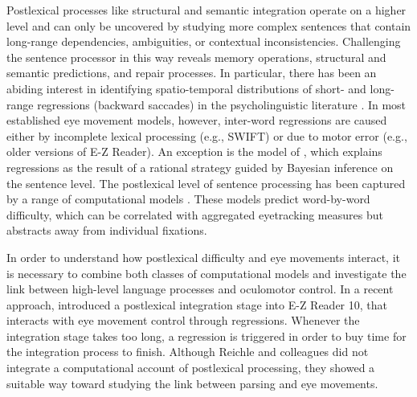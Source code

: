 \documentclass{cambridge7A}\usepackage[]{graphicx}\usepackage[]{color}
\begin{document}
Postlexical processes  like structural and semantic integration operate on a higher level and can only be uncovered by studying more complex sentences that contain long-range dependencies, ambiguities, or contextual inconsistencies.  Challenging the sentence processor in this way reveals memory operations, structural and semantic predictions, and repair processes.
In particular, there has been an abiding interest in identifying spatio-temporal distributions of short- and long-range regressions (backward saccades) in the  psycholinguistic literature \citep{vanDyke2003,FrazierRayner1982,MalsburgVasishth2011,MalsburgVasishth2012,Meseguer2002,MitchellEtAl2008,Weger2007}. 
In most established eye movement models, however, inter-word regressions are caused either by incomplete lexical processing (e.g., SWIFT) or due to motor error (e.g., older versions of E-Z Reader).  An exception is the model of \cite{BicknellLevy2010a}, which explains regressions as the result of a rational strategy guided by Bayesian inference on the sentence level. 
The postlexical level of sentence processing has been captured by a range of computational models \citep{Binder2001,Elman:2005p2,Hale2011,JustCarpenter1992,Konieczny2003,Budiu2004,LewisVasishth2005,MacDonaldChristiansen2002,SpiveyTanenhaus1998,VasishthBruessowLewis2008}.  These models predict word-by-word difficulty, which can be correlated with aggregated eyetracking measures but abstracts away from individual fixations.

In order to understand how postlexical difficulty and eye movements interact, it is necessary to combine both classes of computational models and investigate the link between high-level language processes and oculomotor control.  In a recent approach, \cite{ReichleWarrenMcConnell2009} introduced a postlexical integration stage into E-Z Reader 10, that interacts with eye movement control through regressions.  Whenever the integration stage takes too long, a regression is triggered in order to buy time for the integration process to finish.  Although Reichle and colleagues did not integrate a computational account of postlexical processing, they showed a suitable way toward studying the link between parsing and eye movements.
\end{document}
